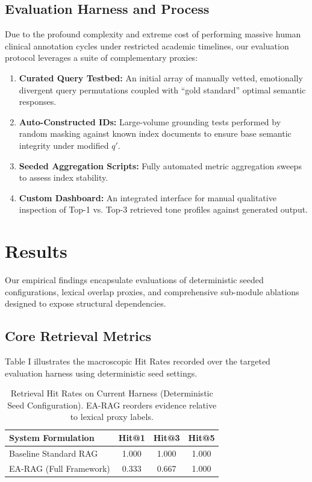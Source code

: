 \documentclass[conference]{IEEEtran}
\begin{document}
\subsection{Evaluation Harness and Process}
Due to the profound complexity and extreme cost of performing massive human clinical annotation cycles under restricted academic timelines, our evaluation protocol leverages a suite of complementary proxies:
\begin{enumerate}
    \item \textbf{Curated Query Testbed:} An initial array of manually vetted, emotionally divergent query permutations coupled with ``gold standard'' optimal semantic responses.
    \item \textbf{Auto-Constructed IDs:} Large-volume grounding tests performed by random masking against known index documents to ensure base semantic integrity under modified $q'$.
    \item \textbf{Seeded Aggregation Scripts:} Fully automated metric aggregation sweeps to assess index stability.
    \item \textbf{Custom Dashboard:} An integrated interface for manual qualitative inspection of Top-1 vs. Top-3 retrieved tone profiles against generated output.
\end{enumerate}


\section{Results}

Our empirical findings encapsulate evaluations of deterministic seeded configurations, lexical overlap proxies, and comprehensive sub-module ablations designed to expose structural dependencies.

\subsection{Core Retrieval Metrics}
Table I illustrates the macroscopic Hit Rates recorded over the targeted evaluation harness using deterministic seed settings. 

\begin{table}[htbp]
\caption{Retrieval Hit Rates on Current Harness (Deterministic Seed Configuration). EA-RAG reorders evidence relative to lexical proxy labels.}
\begin{center}
\begin{tabular}{@{}lccc@{}}
\toprule
\textbf{System Formulation} & \textbf{Hit@1} & \textbf{Hit@3} & \textbf{Hit@5} \\
\midrule
Baseline Standard RAG & 1.000 & 1.000 & 1.000 \\
EA-RAG (Full Framework) & 0.333 & 0.667 & 1.000 \\
\bottomrule
\end{tabular}
\label{tab:hit_rates}
\end{center}
\end{table}
\end{document}

